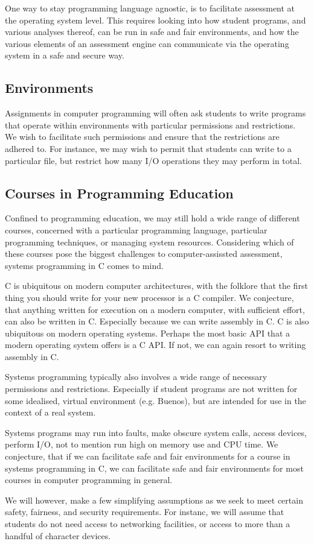 One way to stay programming language agnostic, is to facilitate assessment at
the operating system level. This requires looking into how student programs,
and various analyses thereof, can be run in safe and fair environments, and how
the various elements of an assessment engine can communicate via the operating
system in a safe and secure way.

\subsection{Environments}

Assignments in computer programming will often ask students to write programs
that operate within environments with particular permissions and restrictions.
We wish to facilitate such permissions and ensure that the restrictions are
adhered to. For instance, we may wish to permit that students can write to a
particular file, but restrict how many I/O operations they may perform in
total.

\subsection{Courses in Programming Education}

Confined to programming education, we may still hold a wide range of different
courses, concerned with a particular programming language, particular
programming techniques, or managing system resources. Considering which of
these courses pose the biggest challenges to computer-assissted assessment,
systems programming in C comes to mind.

C is ubiquitous on modern computer architectures, with the folklore that the
first thing you should write for your new processor is a C compiler. We
conjecture, that anything written for execution on a modern computer, with
sufficient effort, can also be written in C. Especially because we can write
assembly in C. C is also ubiquitous on modern operating systems. Perhaps the
most basic API that a modern operating system offers is a C API. If not, we can
again resort to writing assembly in C.

Systems programming typically also involves a wide range of necessary
permissions and restrictions. Especially if student programs are not written
for some idealised, virtual environment (e.g. Buenos), but are intended for use
in the context of a real system.

Systems programs may run into faults, make obscure system calls, access
devices, perform I/O, not to mention run high on memory use and CPU time. We
conjecture, that if we can facilitate safe and fair environments for a course
in systems programming in C, we can facilitate safe and fair environments for
most courses in computer programming in general.

We will however, make a few simplifying assumptions as we seek to meet certain
safety, fairness, and security requirements. For instanc, we will assume that
students do not need access to networking facilities, or access to more than a
handful of character devices.
